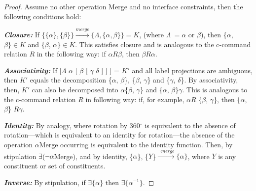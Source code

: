 \documentclass[11pt,twoside]{article}
\theoremstyle{plain}
\numberwithin{equation}{section}
\theoremstyle{definition}
\newtheorem{phrase string}{Phrase String}
\begin{document}
\begin{proof}
Assume no other operation Merge and no interface constraints, then the following conditions hold:

\textsl{\textbf{Closure:}} If $\{\{\alpha\}, \{\beta\}\} \stackrel{merge}{\longrightarrow} \{\Lambda, \{\alpha, \beta\}\} = K$, (where $\Lambda\ = \alpha$ or $\beta$), then \{$\alpha$, $\beta\} \in K$ and \{$\beta$, $\alpha\} \in K$. This satisfies closure and is analogous to the c-command relation $R$ in the following way: if $\alpha R \beta$, then $\beta R \alpha$.

\textsl{\textbf{Associativity:}} If [$\Lambda$ $\alpha$ [ $\beta$ [ $\gamma$ $\delta$ ] ] ] = $K'$ and all label projections are ambiguous, then $K'$ equals the decomposition \{$\alpha$, $\beta$\}, \{$\beta$, $\gamma$\} and \{$\gamma$, $\delta$\}. By associativity, then, $K'$ can also be decomposed into $\alpha$\{$\beta$, $\gamma$\} and  \{$\alpha$, $\beta$\}$\gamma$. This is analogous to the c-command relation $R$ in following way: if, for example,  $\alpha R$ \{$\beta$, $\gamma$\}, then  \{$\alpha$, $\beta$\} $R \gamma$. 

\textsl{\textbf{Identity:}} By analogy, where rotation by 360$^\circ$ is equivalent to the absence of rotation---which is equivalent to an identity for rotation---the absence of the operation $\alpha$Merge occurring is equivalent to the identity function. Then, by stipulation $\exists$($\neg\alpha$Merge), and by identity, \{$\alpha$\}, \{$Y$\}$\stackrel{\neg merge}{\longrightarrow} \{\alpha\}$, where $Y$ is any constituent or set of constituents.

\textsl{\textbf{Inverse:}} By stipulation, if $\exists \{\alpha\}$ then $\exists \{\alpha^{-1}\}$. 

\end{proof}
\end{document}
